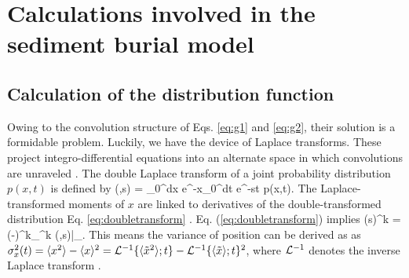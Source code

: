 

\chapter{Calculations involved in the sediment burial model}


\section{Calculation of the distribution function}
\label{sec:appendixA}

Owing to the convolution structure  of Eqs. \ref{eq:g1} and \ref{eq:g2}, their solution is a formidable problem.
Luckily, we have the device of Laplace transforms.
These project integro-differential equations into an alternate space in which convolutions are unraveled \citep[e.g.][]{Arfken1985}.
The double Laplace transform of a joint probability distribution $p(x,t)$ is defined by 
\be {}(\eta,s) = \int_0^\infty dx e^{-\eta x}\int_0^\infty dt e^{-st} p(x,t). \label{eq:doubletransform}\ee
The Laplace-transformed moments of $x$ are linked to derivatives of the double-transformed distribution Eq. \ref{eq:doubletransform} \citep[cf.][]{Berezhkovskii2002}.
Eq. (\ref{eq:doubletransform}) implies
\be \bra {}(s)^k \ket = (-)^k\partial_\eta^k (\eta,s)\Big|_{}.\label{eq:momenttrick}\ee
This means the variance of position can be derived as as $\sigma_x^2(t) = \langle x^2 \rangle - \langle x \rangle^2 = \mathcal{L}^{-1} \{\langle\tilde{x}^2 \rangle;t\} - \mathcal{L}^{-1} \{\langle\tilde{x} \rangle;t\}^2$, where $\mathcal{L}^{-1}$ denotes the inverse Laplace transform \citep[e.g.][]{Arfken1985}.

